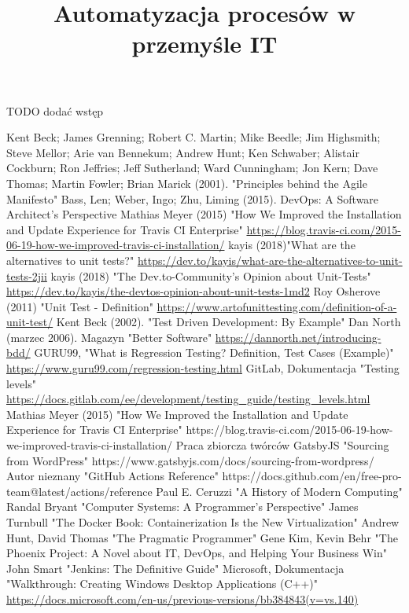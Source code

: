 \documentclass[twoside]{projektInzynierskiMS1}
\title{Automatyzacja procesów w przemyśle IT}
\begin{document}
TODO dodać wstęp









\begin{thebibliography}{12}

 Kent Beck; James Grenning; Robert C. Martin; Mike Beedle; Jim Highsmith; Steve Mellor; Arie van Bennekum; Andrew Hunt; Ken Schwaber; Alistair Cockburn; Ron Jeffries; Jeff Sutherland; Ward Cunningham; Jon Kern; Dave Thomas; Martin Fowler; Brian Marick (2001). "Principles behind the Agile Manifesto"
 Bass, Len; Weber, Ingo; Zhu, Liming (2015). DevOps: A Software Architect's Perspective
 Mathias Meyer (2015)  "How We Improved the Installation and Update Experience for Travis CI Enterprise" \url{https://blog.travis-ci.com/2015-06-19-how-we-improved-travis-ci-installation/}
 kayis (2018)"What are the alternatives to unit tests?" \url{https://dev.to/kayis/what-are-the-alternatives-to-unit-tests-2jii}
 kayis (2018) "The Dev.to-Community's Opinion about Unit-Tests" \url{https://dev.to/kayis/the-devtos-opinion-about-unit-tests-1md2}
 Roy Osherove (2011) "Unit Test - Definition" \url{https://www.artofunittesting.com/definition-of-a-unit-test/}
 Kent Beck (2002). "Test Driven Development: By Example"
 Dan North (marzec 2006). Magazyn "Better Software" \url{https://dannorth.net/introducing-bdd/}
 GURU99, "What is Regression Testing? Definition, Test Cases (Example)" \url{https://www.guru99.com/regression-testing.html}
 GitLab, Dokumentacja "Testing levels" \url{https://docs.gitlab.com/ee/development/testing\_guide/testing\_levels.html}
 Mathias Meyer (2015)  "How We Improved the Installation and Update Experience for Travis CI Enterprise" https://blog.travis-ci.com/2015-06-19-how-we-improved-travis-ci-installation/
 Praca zbiorcza twórców GatsbyJS "Sourcing from WordPress" https://www.gatsbyjs.com/docs/sourcing-from-wordpress/
 Autor nieznany "GitHub Actions Reference" https://docs.github.com/en/free-pro-team@latest/actions/reference
 Paul E. Ceruzzi "A History of Modern Computing"
 Randal Bryant "Computer Systems: A Programmer's Perspective"
 James Turnbull "The Docker Book: Containerization Is the New Virtualization"
 Andrew Hunt, David Thomas "The Pragmatic Programmer"
 Gene Kim, Kevin Behr "The Phoenix Project: A Novel about IT, DevOps, and Helping Your Business Win"
 John Smart "Jenkins: The Definitive Guide"
 Microsoft, Dokumentacja "Walkthrough: Creating Windows Desktop Applications (C++)" \url{https://docs.microsoft.com/en-us/previous-versions/bb384843(v=vs.140)}

\end{thebibliography}
\end{document}
